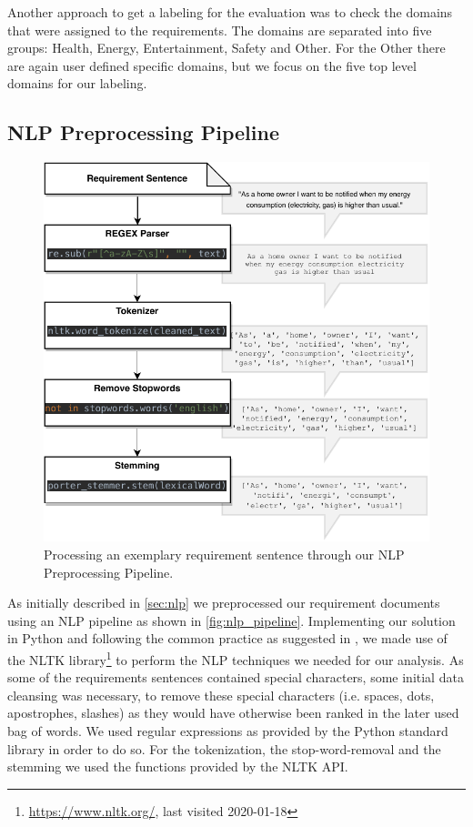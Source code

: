 Another approach to get a labeling for the evaluation was to check the domains that were assigned to the requirements. The domains are separated into five groups: Health, Energy, Entertainment, Safety and Other. For the \grqq{}Other\grqq{} there are again user defined specific domains, but we focus on the five top level domains for our labeling.

\subsection{NLP Preprocessing Pipeline} %
\label{sub:own_pipeline}

\begin{figure}[ht]
  \centering
    \includegraphics[width=\textwidth]{figures/NLP Pipeline.pdf}
    \caption{Processing an exemplary requirement sentence through our NLP Preprocessing Pipeline.}
    \label{fig:nlp_pipeline}
\end{figure}

As initially described in \autoref{sec:nlp} we preprocessed our requirement documents using an NLP pipeline as shown in \autoref{fig:nlp_pipeline}. Implementing our solution in Python and following the common practice as suggested in \cite{ferrari_natural_2018}, we made use of the NLTK library\footnote{\url{https://www.nltk.org/}, last visited 2020-01-18} to perform the NLP techniques we needed for our analysis. As some of the requirements sentences contained special characters, some initial data cleansing was necessary, to remove these special characters (i.e. spaces, dots, apostrophes, slashes) as they would have otherwise been ranked in the later used bag of words. We used regular expressions as provided by the Python standard library in order to do so. For the tokenization, the stop-word-removal and the stemming we used the functions provided by the NLTK API.

